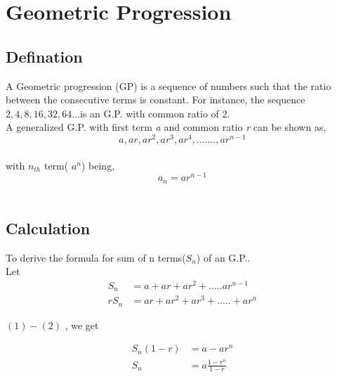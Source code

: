 \documentclass[a4paper,10pt]{article}
\begin{document}

\section{Geometric Progression}
\subsection*{Defination}
A Geometric progression (GP) is a sequence of numbers such that the ratio between the consecutive terms is constant. 
For instance, the sequence $2, 4, 8, 16, 32, 64 … $is an G.P. with common ratio of 2.\\
A generalized G.P. with first term \emph{a} and common ratio \emph{r} can be shown as,
$$a , ar ,  ar^2 ,  ar^3 ,  ar^4 , ....... , ar^{n-1}$$\\
with $n_{th}$ term( $a^n$) being,
$$a_n = ar^{n-1}$$\\

\subsection*{Calculation}
To derive the formula for sum of n terms($S_n$) of an G.P..\\
Let \\
\begin{align}
S_n&= a + ar + ar^2 + ..... ar^{n-1} \\
rS_n&=ar + ar^2 + ar^3 + ..... + ar^n 
\end{align}

$(1) - (2)$ , we get

\begin{align*}
S_n (1 - r) & = a - ar^n\\
S_n & = a \frac{1 - r^n}{1 - r}
\end{align*}
\end{document}
